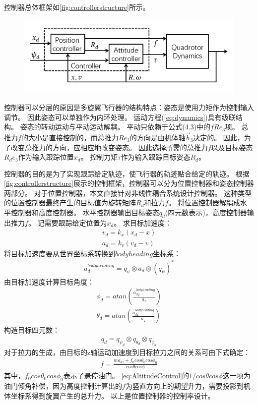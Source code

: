\documentclass[
  type=master
]{gdutthesis}
\begin{document}
控制器总体框架如\autoref{fig:controllerstructure}所示。
\begin{figure}[htbp]
	\centering
	\includegraphics[width=1.0\textwidth]{屏幕截图 2022-04-04 222027.png}
	\label{fig:controllerstructure}
\end{figure}
控制器可以分层的原因是多旋翼飞行器的结构特点：姿态是使用力矩作为控制输入调节。
因此姿态可以单独作为内环处理。
运动方程(\autoref{eq:dynamics})具有级联结构。
姿态的转动运动与平动运动解耦。
平动只依赖于公式(4.3)中的$fRe_3$项。
总推力$f$的大小是直接控制的，而总推力$Re_3$的方向是由机体轴$\vec{b}_3$决定的。
因此，为了改变总推力的方向，应相应地改变姿态。
因此选择所需的总推力$f$以及目标姿态$R_d e_3$作为输入跟踪位置$x_d$。
控制力矩$\tau$作为输入跟踪目标姿态$R_d$。

控制器的目的是为了实现跟踪给定轨迹，使飞行器的轨迹贴合给定的轨迹。
根据\autoref{fig:controllerstructure}展示的控制框架，控制器可以分为位置控制器和姿态控制器两部分。
对于位置控制器，本文直接针对非线性耦合系统设计控制器。
这种类型的位置控制器最终产生的目标值为旋转矩阵$R_d$和拉力$f$。
将位置控制器解耦成水平控制器和高度控制器。
水平控制器输出目标姿态$q_d$(四元数表示)，高度控制器输出推力$f$。
记需要跟踪给定位置为$x_d$。
求目标加速度：
\begin{gather}
	v_d = k_x (x_d - x)\\
	a_d = k_v (v_d - v)
\end{gather}
将目标加速度要从世界坐标系转换到$bodyheading$坐标系：\vspace{1ex}
\begin{gather}
a_d^{bodyheading} = q_{\psi} \otimes a_d \otimes (q_{\psi})^{*}
\end{gather}
由目标加速度计算目标角度：
\begin{gather}
	\phi_d = atan(\frac{a_{dy}^{bodyheading}}{a_z})\\
	\theta_d = atan(\frac{a_{dx}^{bodyheading}}{a_z})
\end{gather}
构造目标四元数：
\begin{gather}
	q_d = q_{\psi_d} \otimes q_{\theta_d} \otimes q_{\phi_d}
\end{gather}
对于拉力的生成，由目标的z轴运动加速度到目标拉力之间的关系可由下式确定：\vspace{1ex}
\begin{gather}\label{eq:AltitudeControl}
	f = \frac{ma_{dz} + f_0 cos\theta_0 cos\phi_0}{cos\theta cos\phi}
\end{gather}
其中，$f_0 cos\theta_0 cos\phi_0$表示了悬停油门。
\autoref{eq:AltitudeControl}的$1/cos\theta cos\phi$这一项为油门倾角补偿，因为高度控制计算出的$f$为竖直方向上的期望升力，需要投影到机体坐标系得到旋翼产生的总升力。
以上是位置控制器的控制率设计。
\end{document}
